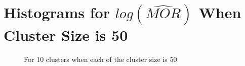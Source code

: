 \documentclass[
  letterpaper,
  DIV=11,
  numbers=noendperiod]{scrartcl}
\begin{document}
\newpage

\hypertarget{histograms-for-logwidehatmor-when-cluster-size-is-50}{%
\section{\texorpdfstring{Histograms for \(log(\widehat{MOR})\) When
Cluster Size is
50}{Histograms for log(\textbackslash widehat\{MOR\}) When Cluster Size is 50}}\label{histograms-for-logwidehatmor-when-cluster-size-is-50}}

\vspace{5mm}

\begin{figure}

\begin{minipage}[t]{0.44\linewidth}

{\centering 


\caption{For 10 clusters when each of the cluster size is 50}

}

\end{minipage}%
%
\begin{minipage}[t]{0.11\linewidth}


\end{minipage}
\end{figure}
\end{document}
